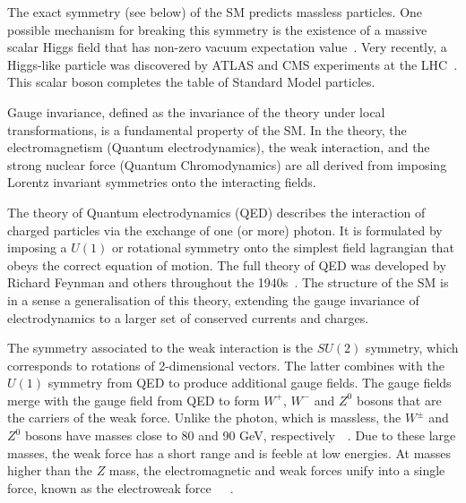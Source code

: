 The exact symmetry (see below) of the SM predicts massless particles.  One possible mechanism for breaking this symmetry is the existence of a massive scalar Higgs field that has non-zero vacuum expectation value~\cite{Higgs1964132}. Very recently, a Higgs-like particle was discovered by ATLAS and CMS experiments at the LHC~\cite{:2012gk,}. This scalar boson completes the table of Standard Model particles. %


Gauge invariance, defined as the invariance of the theory under local transformations, is a fundamental property of the SM.  In the theory, the electromagnetism (Quantum electrodynamics), the weak interaction, and the strong nuclear force (Quantum Chromodynamics) are all derived from imposing Lorentz invariant symmetries onto the interacting fields. 

The theory of Quantum electrodynamics (QED) describes the interaction of charged particles via the exchange of one (or more) photon. It is formulated by imposing a $U(1)$ or rotational symmetry onto the simplest field lagrangian that obeys the correct equation of motion. The full theory of QED was developed by Richard Feynman and others throughout the 1940s~\cite{PhysRev.75.486}.  The structure of the SM is in a sense a generalisation of this theory, extending the gauge invariance of electrodynamics to a larger set of conserved currents and charges. 

The symmetry associated to the weak interaction is the $SU(2)$ symmetry, which corresponds to rotations of 2-dimensional vectors. The latter combines with the $U(1)$ symmetry from QED to produce additional gauge fields. The gauge fields merge with the gauge field from QED to form $W^+$, $W^-$ and $Z^0$ bosons that are the carriers of the weak force.  Unlike the photon, which is massless, the  $W^{\pm}$ and $Z^0$ bosons have masses close to 80 and 90 GeV, respectively~\cite{Banner1983476}~\cite{Arnison1983398}. Due to these large masses, the weak force has a short range and is feeble at low energies.  At masses higher than the $Z$ mass, the electromagnetic and weak forces unify into a single force, known as the electroweak force~\cite{Glashow1961579}~\cite{Salam1964168}~\cite{PhysRevLett.19.1264}.

